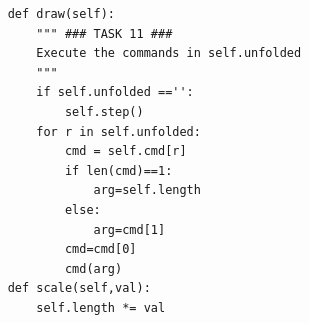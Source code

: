 \documentclass[titlepage]{article}
\begin{document}
\begin{verbatim}
    def draw(self):
        """ ### TASK 11 ### 
        Execute the commands in self.unfolded
        """
        if self.unfolded =='':
            self.step()
        for r in self.unfolded:
            cmd = self.cmd[r]
            if len(cmd)==1:
                arg=self.length
            else:
                arg=cmd[1]
            cmd=cmd[0]
            cmd(arg)
    def scale(self,val):
        self.length *= val
\end{verbatim}
\end{document}
